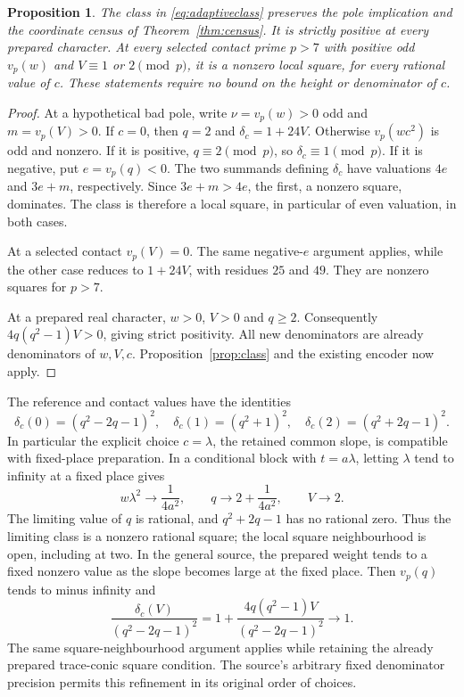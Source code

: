 \documentclass[11pt,a4paper]{article}
\newtheorem{proposition}[theorem]{Proposition}
\begin{document}
\begin{proposition}\label{prop:adaptiveclass}
The class in \eqref{eq:adaptiveclass} preserves the pole implication
and the coordinate census of Theorem~\ref{thm:census}. It is strictly
positive at every prepared character. At every selected contact prime
$p>7$ with positive odd $v_p(w)$ and $V\equiv1$ or $2\pmod p$,
it is a nonzero local square, for every rational value of $c$.
These statements require no bound on the height or denominator of $c$.
\end{proposition}
\begin{proof}
At a hypothetical bad pole, write $\nu=v_p(w)>0$ odd and
$m=v_p(V)>0$. If $c=0$, then $q=2$ and $\delta_c=1+24V$.
Otherwise $v_p(wc^2)$ is odd and nonzero. If it is positive,
$q\equiv2\pmod p$, so $\delta_c\equiv1\pmod p$.
If it is negative, put $e=v_p(q)<0$. The two summands defining
$\delta_c$ have valuations $4e$ and $3e+m$, respectively.
Since $3e+m>4e$, the first, a nonzero square, dominates.
The class is therefore a local square, in particular of even
valuation, in both cases.

At a selected contact $v_p(V)=0$. The same negative-$e$ argument
applies, while the other case reduces to $1+24V$, with residues
$25$ and $49$. They are nonzero squares for $p>7$.

At a prepared real character, $w>0$, $V>0$ and $q\ge2$.
Consequently $4q(q^2-1)V>0$, giving strict positivity.
All new denominators are already denominators of $w,V,c$.
Proposition~\ref{prop:class} and the existing encoder now apply.
\end{proof}

The reference and contact values have the identities
\[
 \delta_c(0)=(q^2-2q-1)^2,\quad
 \delta_c(1)=(q^2+1)^2,\quad
 \delta_c(2)=(q^2+2q-1)^2.
\]
In particular the explicit choice $c=\lambda$, the retained common
slope, is compatible with fixed-place preparation. In a conditional
block with $t=a\lambda$, letting $\lambda$ tend to infinity at a
fixed place gives
\[
 w\lambda^2\longrightarrow\frac1{4a^2},\qquad
 q\longrightarrow2+\frac1{4a^2},\qquad V\longrightarrow2.
\]
The limiting value of $q$ is rational, and $q^2+2q-1$ has no rational
zero. Thus the limiting class is a nonzero rational square; the local
square neighbourhood is open, including at two. In the general source,
the prepared weight tends to a fixed nonzero value as the slope
becomes large at the fixed place. Then $v_p(q)$ tends to minus infinity
and
\[
 \frac{\delta_c(V)}{(q^2-2q-1)^2}
 =1+\frac{4q(q^2-1)V}{(q^2-2q-1)^2}\longrightarrow1.
\]
The same square-neighbourhood argument applies while retaining the
already prepared trace-conic square condition. The source's arbitrary
fixed denominator precision permits this refinement in its original
order of choices.
\end{document}
